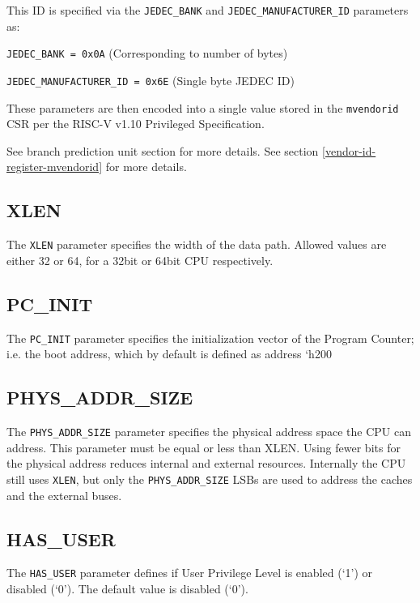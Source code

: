  \noindent This ID is specified via the \texttt{JEDEC\_BANK} and
 \texttt{JEDEC\_MANUFACTURER\_ID} parameters as:

 \indent\indent\texttt{JEDEC\_BANK = 0x0A} (Corresponding to number of bytes)

 \indent\indent\texttt{JEDEC\_MANUFACTURER\_ID = 0x6E} (Single byte JEDEC ID)

\noindent These parameters are then encoded into a single value stored in the
\texttt{mvendorid} CSR per the RISC-V v1.10 Privileged Specification.

\ifdefined\MARKDOWN
See branch prediction unit section for more details.
\else
See section \ref{vendor-id-register-mvendorid}  for more details.
\fi

\subsection{XLEN}\label{xlen}

The \texttt{XLEN} parameter specifies the width of the data path. Allowed values
are either 32 or 64, for a 32bit or 64bit CPU respectively.

\subsection{PC\_INIT}\label{pc_init}

The \texttt{PC\_INIT} parameter specifies the initialization vector of the
Program Counter; i.e. the boot address, which by default is defined as address
`h200

\subsection{PHYS\_ADDR\_SIZE}\label{phys_addr_size}

The \texttt{PHYS\_ADDR\_SIZE} parameter specifies the physical address space the
CPU can address. This parameter must be equal or less than XLEN. Using fewer
bits for the physical address reduces internal and external resources.
Internally the CPU still uses \texttt{XLEN}, but only the
\texttt{PHYS\_ADDR\_SIZE} LSBs are used to address the caches and the external
buses.

\subsection{HAS\_USER}\label{has_user}

The \texttt{HAS\_USER} parameter defines if User Privilege Level is enabled
(`1') or disabled (`0'). The default value is disabled (`0').

